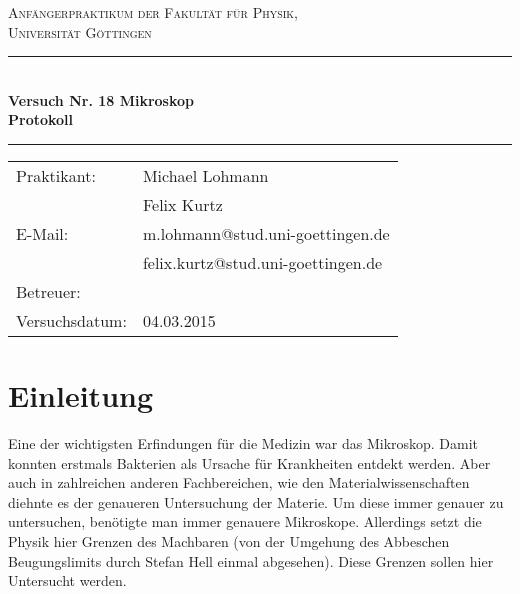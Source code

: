 \documentclass[12pt,a4paper,titlepage,headinclude,bibtotoc]{scrartcl}
\begin{document}
\begin{titlepage}
\centering
\textsc{\Large Anfängerpraktikum der Fakultät für
  Physik,\\[1.5ex] Universität Göttingen}

\vspace*{3cm}

\rule{\textwidth}{1pt}\\[0.5cm]
{\huge \bfseries
  Versuch Nr. 18 Mikroskop \\[1.5ex]
  Protokoll}\\[0.5cm]
\rule{\textwidth}{1pt}

\vspace*{3cm}

\begin{Large}
\begin{tabular}{ll}
Praktikant: &  Michael Lohmann\\
 &  Felix Kurtz\\
 E-Mail: & m.lohmann@stud.uni-goettingen.de\\
 &  felix.kurtz@stud.uni-goettingen.de\\
 Betreuer: & \\
 Versuchsdatum: & 04.03.2015\\
\end{tabular}
\end{Large}

\vspace*{0.8cm}

\begin{Large}
\end{Large}

\end{titlepage}

\tableofcontents

\newpage

\section{Einleitung}
\label{sec:einleitung}
Eine der wichtigsten Erfindungen für die Medizin war das Mikroskop.
Damit konnten erstmals Bakterien als Ursache für Krankheiten entdekt werden.
Aber auch in zahlreichen anderen Fachbereichen, wie den Materialwissenschaften diehnte es der genaueren Untersuchung der Materie.
Um diese immer genauer zu untersuchen, benötigte man immer genauere Mikroskope.
Allerdings setzt die Physik hier Grenzen des Machbaren (von der Umgehung des Abbeschen Beugungslimits durch Stefan Hell einmal abgesehen).
Diese Grenzen sollen hier Untersucht werden.
\end{document}
